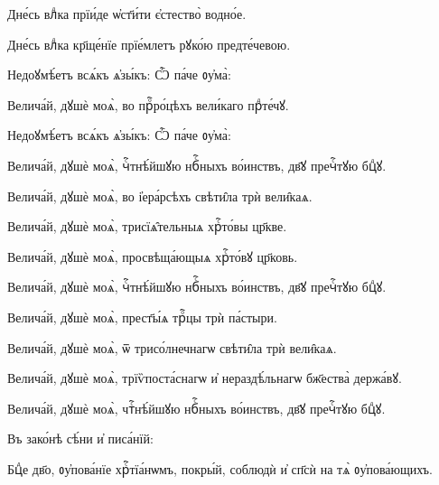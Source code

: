 \hKv Дне́сь влⷣка прїи́де ѡ҆ст҃и́ти є҆стество̀ водно́е. 

\hKv Дне́сь влⷣка кр҃ще́нїе прїе́млетъ рꙋко́ю предте́чевою. 

 Недоꙋмѣ́етъ всѧ́къ  ѧ҆зы́къ:  Ѽ  па́че ᲂу҆ма̀:  


\hKv Велича́й, дꙋшѐ моѧ̀, во прⷪ҇ро́цѣхъ вели́каго прⷣте́чꙋ.   

 Недоꙋмѣ́етъ всѧ́къ ѧ҆зы́къ: 
 Ѽ па́че ᲂу҆ма̀:  

%

\hKv Велича́й, дꙋшѐ моѧ̀, чⷭ҇тнѣ́йшꙋю нбⷭ҇ныхъ во́инствъ, дв҃ꙋ  пречⷭ҇тꙋю бцⷣꙋ.  
%
%


\hKv Велича́й, дꙋшѐ моѧ̀, во і҆ера́рсѣхъ свѣти̑ла трѝ  вели̑каѧ. 

\hKv Велича́й, дꙋшѐ моѧ̀, трисїѧ̑тельныѧ хрⷭ҇то́вы цр҃кве.  

\hKv Велича́й, дꙋшѐ моѧ̀, просвѣща́ющыѧ хрⷭ҇то́вꙋ цр҃ковь. 

\hKv Велича́й, дꙋшѐ моѧ̀, чⷭ҇тнѣ́йшꙋю нбⷭ҇ныхъ во́инствъ, дв҃ꙋ  пречⷭ҇тꙋю бцⷣꙋ. 

\hKv Велича́й, дꙋшѐ моѧ̀, прест҃ы́ѧ трⷪ҇цы трѝ па́стыри. 

\hKv Велича́й, дꙋшѐ моѧ̀, ѿ трисо́лнечнагѡ свѣти̑ла трѝ  вели̑каѧ. 

\hKv Велича́й, дꙋшѐ моѧ̀, трїѷпоста́снагѡ и҆ нераздѣ́льнагѡ  бж҃ества̀ держа́вꙋ. 

\hKv Велича́й, дꙋшѐ моѧ̀, чтⷭ҇нѣ́йшꙋю нбⷭ҇ныхъ во́инствъ, дв҃ꙋ  пречⷭ҇тꙋю бцⷣꙋ. 

 Въ зако́нѣ сѣ́ни и҆ писа́нїй: 


\hKv Бцⷣе дв҃о, ᲂу҆пова́нїе хрⷭ҇тїа́нѡмъ, покры́й, соблюдѝ и҆  сп҃сѝ на тѧ̀ ᲂу҆пова́ющихъ. 

